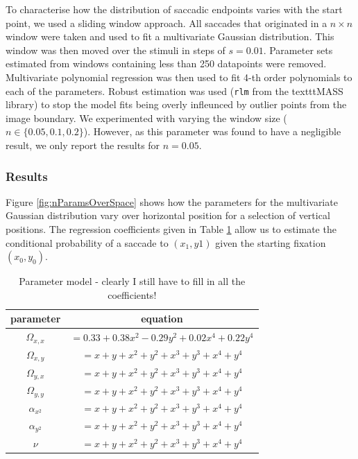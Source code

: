 \documentclass[a4paper, onecolumn, oneside, 11pt]{article}
\begin{document}
To characterise how the distribution of saccadic endpoints varies with the start point, we used a sliding window approach. All saccades that originated in a $n\times n$ window were taken and used to fit a multivariate Gaussian distribution. This window was then moved over the stimuli in steps of $s=0.01$. Parameter sets estimated from windows containing less than 250 datapoints were removed. Multivariate polynomial regression was then used to fit 4-th order polynomials to each of the parameters. Robust estimation was used (\texttt{rlm} from the texttt{MASS} library) to stop the model fits being overly infleunced by outlier points from the image boundary. We experimented with varying the window size ($n\in\{0.05,0.1, 0.2\}$). However, as this parameter was found to have a negligible result, we only report the results for $n=0.05$.


\subsubsection{Results}

Figure \ref{fig:nParamsOverSpace} shows how the parameters for the multivariate Gaussian distribution vary over horizontal position for a selection of vertical positions. The regression coefficients given in Table \ref{tab:nParamModel} allow us to estimate the conditional probability of a saccade to $(x_1, y1)$ given the starting fixation $(x_0, y_0)$.

\begin{table}
\centering
\begin{tabular}{c c}
parameter & equation \\
\hline
$\Omega_{x,x}$	& $= 0.33+ 0.38x^2 -0.29y^2 + 0.02x^4 + 0.22y^4$ \\ 
$\Omega_{x,y}$	& $=x + y + x^2 + y^2 + x^3 + y^3 + x^4 + y^4$ \\ 
$\Omega_{y,x}$	& $=x + y + x^2 + y^2 + x^3 + y^3 + x^4 + y^4$ \\ 
$\Omega_{y,y}$	& $=x + y + x^2 + y^2 + x^3 + y^3 + x^4 + y^4$ \\ 
\hline
$\alpha_{x^2}$		& $=x + y + x^2 + y^2 + x^3 + y^3 + x^4 + y^4$ \\ 
$\alpha_{y^2}$		& $=x + y + x^2 + y^2 + x^3 + y^3 + x^4 + y^4$ \\ 
\hline
$\nu$			& $=x + y + x^2 + y^2 + x^3 + y^3 + x^4 + y^4$ \\ 
\end{tabular}
\caption{Parameter model - clearly I still have to fill in all the coefficients!}
\label{tab:nParamModel}
\end{table}
\end{document}
